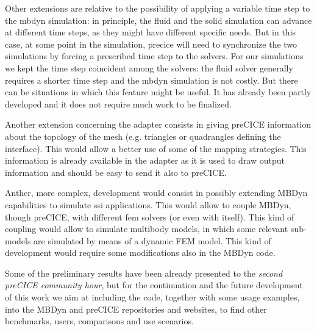 Other extensions are relative to the possibility of applying a variable time step to the \acrshort{mbdyn} simulation: in principle, the fluid and the solid simulation can advance at different time steps, as they might have different specific needs. But in this case, at some point in the simulation, \acrshort{precice} will need to synchronize the two simulations by forcing a prescribed time step to the solvers. For our simulations we kept the time step coincident among the solvers: the fluid solver generally requires a shorter time step and the \acrshort{mbdyn} simulation is not costly. But there can be situations in which this feature might be useful. It has already been partly developed and it does not require much work to be finalized.

Another extension concerning the adapter consists in giving preCICE information about the topology of the mesh (e.g. triangles or quadrangles defining the interface). This would allow a better use of some of the mapping strategies. This information is already available in the adapter as it is used to draw output information and should be easy to send it also to preCICE.

Anther, more complex, development would consist in possibly extending MBDyn capabilities to simulate \acrfull{ssi} applications. This would allow to couple MBDyn, though preCICE, with different \acrshort{fem} solvers (or even with itself). This kind of coupling would allow to simulate multibody models, in which some relevant sub-models are simulated by means of a dynamic FEM model. This kind of development would require some modifications also in the MBDyn code.

Some of the preliminary results have been already presented to the \textit{second preCICE community hour}, but for the continuation and the future development of this work we aim at including the code, together with some usage examples, into the MBDyn and preCICE repositories and websites, to find other benchmarks, users, comparisons and use scenarios.


